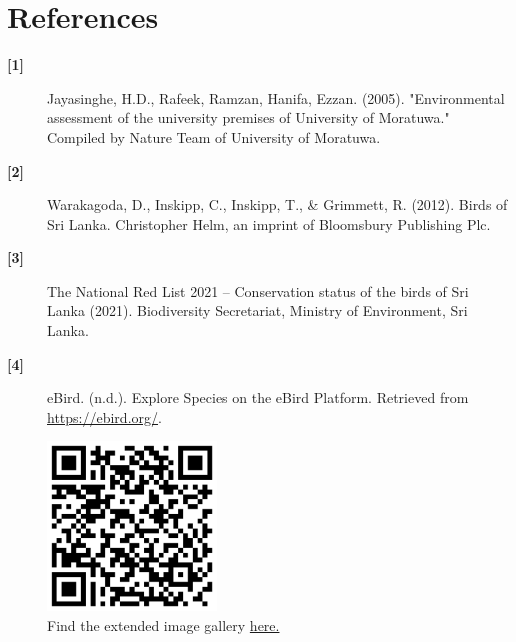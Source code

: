 \chapter{References}
\label{cp:References}

\begin{description}
    \item[\textbf{[1]}] Jayasinghe, H.D., Rafeek, Ramzan, Hanifa, Ezzan. (2005). "Environmental assessment of the university premises of University of Moratuwa." Compiled by Nature Team of University of Moratuwa.
    \\
    \item[\textbf{[2]}] Warakagoda, D., Inskipp, C., Inskipp, T., \& Grimmett, R. (2012). Birds of Sri Lanka. Christopher Helm, an imprint of Bloomsbury Publishing Plc.
    \\
    \item[\textbf{[3]}] The National Red List 2021 – Conservation status of the birds of Sri Lanka (2021). Biodiversity Secretariat, Ministry of Environment, Sri Lanka.
    \\
    \item[\textbf{[4]}] eBird. (n.d.). Explore Species on the eBird Platform. Retrieved from \url{https://ebird.org/}.
\end{description}

\begin{figure}[!htpb]
    \centering
    \includegraphics[width=0.4\textwidth]{Figures/QR.png}
    \caption[]{Find the extended image gallery \href{https://chathura-de-silva.github.io/Mora-Bird-Diversity/}{here.}}
    \label{fig:figure-01}
\end{figure}